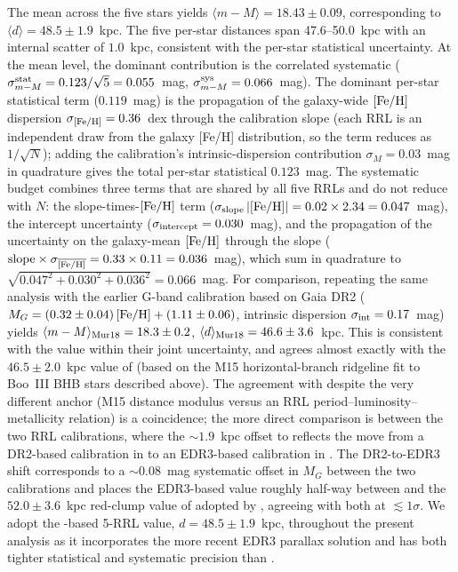 \documentclass[twocolumn, apj, numberedappendix, appendixfloats]{openjournal_dhayaa}
\begin{document}
The mean across the five stars yields $\langle m-M \rangle = 18.43 \pm 0.09$, corresponding to $\langle d \rangle = 48.5 \pm 1.9$~kpc.  The five per-star distances span 47.6--50.0~kpc with an internal scatter of $1.0$~kpc, consistent with the per-star statistical uncertainty.  At the mean level, the dominant contribution is the correlated systematic ($\sigma_{m-M}^{\rm stat} = 0.123/\sqrt{5} = 0.055$~mag, $\sigma_{m-M}^{\rm sys} = 0.066$~mag).  The dominant per-star statistical term ($0.119$~mag) is the propagation of the galaxy-wide $[{\rm Fe/H}]$ dispersion $\sigma_{[{\rm Fe/H}]} = 0.36$~dex through the calibration slope (each RRL is an independent draw from the galaxy [Fe/H] distribution, so the term reduces as $1/\sqrt{N}$); adding the calibration's intrinsic-dispersion contribution $\sigma_M = 0.03$~mag in quadrature gives the total per-star statistical $0.123$~mag.  The systematic budget combines three terms that are shared by all five RRLs and do not reduce with $N$: the slope-times-$[{\rm Fe/H}]$ term ($\sigma_{\rm slope}\,|[{\rm Fe/H}]| = 0.02 \times 2.34 = 0.047$~mag), the intercept uncertainty ($\sigma_{\rm intercept} = 0.030$~mag), and the propagation of the uncertainty on the galaxy-mean $[{\rm Fe/H}]$ through the slope (${\rm slope} \times \sigma_{\overline{[{\rm Fe/H}]}} = 0.33 \times 0.11 = 0.036$~mag), which sum in quadrature to $\sqrt{0.047^2 + 0.030^2 + 0.036^2} = 0.066$~mag. For comparison, repeating the same analysis with the earlier \citet{Muraveva2018} G-band calibration based on Gaia DR2 ($M_G = (0.32 \pm 0.04)\,[{\rm Fe/H}] + (1.11 \pm 0.06)$, intrinsic dispersion $\sigma_{\rm int} = 0.17$~mag) yields $\langle m-M \rangle_{\rm Mur18} = 18.3 \pm 0.2$, $\langle d \rangle_{\rm Mur18} = 46.6 \pm 3.6$~kpc. This is consistent with the \citet{Garofalo2022} value within their joint uncertainty, and agrees almost exactly with the $46.5 \pm 2.0$~kpc value of \citet{Carlin2018} (based on the M15 horizontal-branch ridgeline fit to Boo~III BHB stars described above). The agreement with \citet{Carlin2018} despite the very different anchor (M15 distance modulus versus an RRL period--luminosity--metallicity relation) is a coincidence; the more direct comparison is between the two RRL calibrations, where the $\sim 1.9$~kpc offset to \citet{Garofalo2022} reflects the move from a DR2-based calibration in \citet{Muraveva2018} to an EDR3-based calibration in \citet{Garofalo2022}. The DR2-to-EDR3 shift corresponds to a $\sim 0.08$~mag systematic offset in $M_G$ between the two calibrations and places the EDR3-based value roughly half-way between \citet{Carlin2018} and the $52.0 \pm 3.6$~kpc red-clump value of \citet{Correnti2009} adopted by \citet{Moskowitz2020}, agreeing with both at $\lesssim 1\sigma$. We adopt the \citet{Garofalo2022}-based 5-RRL value, $d = 48.5 \pm 1.9$~kpc, throughout the present analysis as it incorporates the more recent EDR3 parallax solution and has both tighter statistical and systematic precision than \citet{Muraveva2018}.
\end{document}
